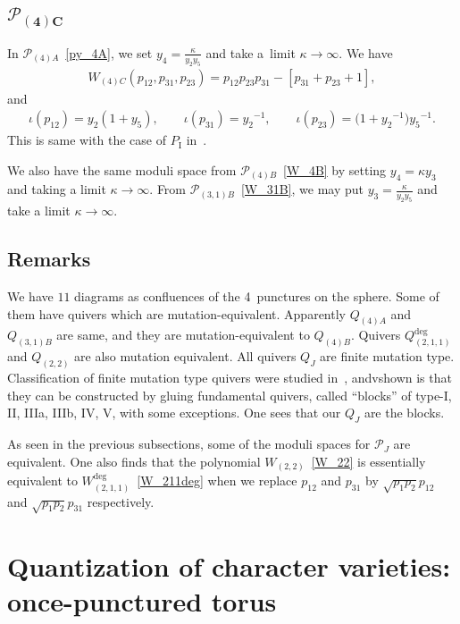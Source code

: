 \documentclass[10pt,a4paper]{amsart}
\numberwithin{equation}{section}
\begin{document}
\subsection[$\mathcal{P}_{(4)C}$]{$\boldsymbol{\mathcal{P}_{(4)C}}$}
In $\mathcal{P}_{(4)A}$~\eqref{py_4A}, we set $y_4=\frac{\kappa}{y_2 y_5}$ and take a~limit $\kappa \to \infty$. We have
\begin{gather*}
 W_{(4)C}(p_{12}, p_{31}, p_{23}) = p_{12} p_{23} p_{31} - [ p_{31}+ p_{23} + 1 ] ,
\end{gather*}
and
\begin{gather*}
 \iota(p_{12}) = y_2 ( 1 + y_5 ) ,\qquad \iota(p_{31}) = {y_2}^{-1}, \qquad \iota(p_{23}) = \big( 1+{y_2}^{-1} \big) {y_5}^{-1} .
\end{gather*}
This is same with the case of $P_{\mathrm{I}}$ in~\cite{vdPutSaito09a}.

We also have the same moduli space from $\mathcal{P}_{(4)B}$~\eqref{W_4B} by setting $y_4 = \kappa y_3$ and taking a limit $\kappa \to \infty$. From $\mathcal{P}_{(3,1)B}$~\eqref{W_31B}, we may put $y_3=\frac{\kappa}{y_2 y_5}$ and take a limit $\kappa\to\infty$.

\subsection{Remarks}
We have $11$ diagrams as confluences of the 4~punctures on the sphere. Some of them have quivers which are mutation-equivalent. Apparently $Q_{(4)A}$ and $Q_{(3,1)B}$ are same, and they are mutation-equivalent to $Q_{(4)B}$.
Quivers $Q_{(2,1,1)}^{\text{deg}}$ and $Q_{(2,2)}$ are also mutation equivalent. All quivers $Q_J$ are finite mutation type. Classification of finite mutation type quivers were studied in~\cite{FeliShapTuma12a, FomiShapThur08a}, andvshown is that they can be constructed by gluing fundamental quivers, called ``blocks'' of type-I, II, IIIa, IIIb, IV, V, with some exceptions. One sees that our $Q_J$ are the blocks.

As seen in the previous subsections, some of the moduli spaces for $\mathcal{P}_J$ are equivalent. One also finds that the polynomial $W_{(2,2)}$~\eqref{W_22} is essentially equivalent to $W_{(2,1,1)}^{\text{deg}}$~\eqref{W_211deg} when we replace $p_{12}$ and $p_{31}$ by $\sqrt{p_1 p_2} p_{12}$ and $\sqrt{p_1 p_2} p_{31}$ respectively.

\section{Quantization of character varieties: once-punctured torus}\label{sec:q_torus}
\end{document}
